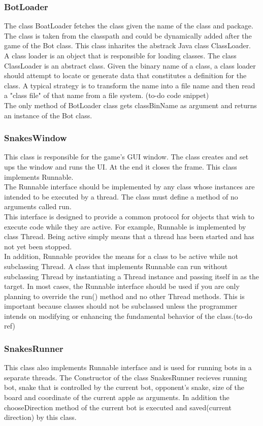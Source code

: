 \documentclass[a4paper,12pt]{article}
\begin{document}
\subsubsection{BotLoader}
The class BoatLoader fetches the class given the name  of the class and package. The class is taken from the classpath and could be dynamically added after the game of the Bot class. This class inharites the abstrack Java class ClassLoader.\\
A class loader is an object that is responsible for loading classes. The class ClassLoader is an abstract class. Given the binary name of a class, a class loader should attempt to locate or generate data that constitutes a definition for the class. A typical strategy is to transform the name into a file name and then read a "class file" of that name from a file system.%
(to-do code snippet)
\\
The only method of BotLoader class gets classBinName as argument and returns an instance of the Bot class.

\subsubsection{SnakesWindow}
This class is responsible for the game's GUI window. The class creates and set ups the window and runs the UI. At the end it closes the frame. This class implements Runnable.\\
The Runnable interface should be implemented by any class whose instances are intended to be executed by a thread. The class must define a method of no arguments called run.\\
This interface is designed to provide a common protocol for objects that wish to execute code while they are active. For example, Runnable is implemented by class Thread. Being active simply means that a thread has been started and has not yet been stopped.\\
In addition, Runnable provides the means for a class to be active while not subclassing Thread. A class that implements Runnable can run without subclassing Thread by instantiating a Thread instance and passing itself in as the target. In most cases, the Runnable interface should be used if you are only planning to override the run() method and no other Thread methods. This is important because classes should not be subclassed unless the programmer intends on modifying or enhancing the fundamental behavior of the class.(to-do ref)
\subsubsection{SnakesRunner}
This class also implements Runnable interface and is used for running bots in a separate threads. The Constructor of the class SnakesRunner recieves running bot, snake that is controlled by the current bot, opponent's snake, size of the board and coordinate of the current apple as arguments. In addition the chooseDirection method of the current bot is executed and saved(current direction) by this class. 
\end{document}
